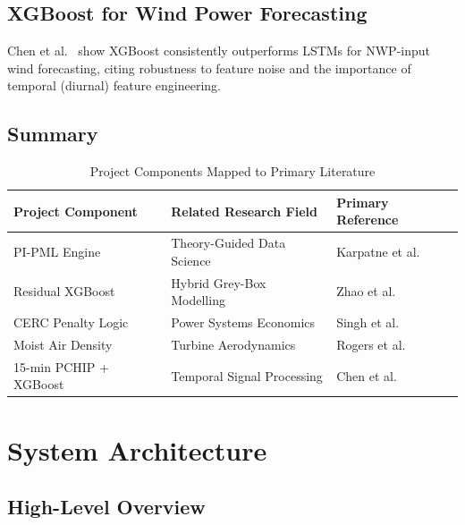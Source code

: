 \documentclass[12pt,a4paper]{report}
\begin{document}
\section{XGBoost for Wind Power Forecasting}

Chen et al.~\cite{chen2018xgboost} show XGBoost consistently outperforms LSTMs for NWP-input
wind forecasting, citing robustness to feature noise and the importance of temporal
(diurnal) feature engineering.

\section{Summary}

\begin{table}[H]
  \centering
  \caption{Project Components Mapped to Primary Literature}
  \label{tab:lit_summary}
  \begin{tabularx}{\textwidth}{lXl}
    \toprule
    \textbf{Project Component} & \textbf{Related Research Field} & \textbf{Primary Reference} \\
    \midrule
    PI-PML Engine           & Theory-Guided Data Science        & Karpatne et al.~\cite{karpatne2017theory} \\
    Residual XGBoost        & Hybrid Grey-Box Modelling         & Zhao et al.~\cite{zhao2016hybrid} \\
    CERC Penalty Logic      & Power Systems Economics           & Singh et al.~\cite{singh2020dsm} \\
    Moist Air Density       & Turbine Aerodynamics              & Rogers et al.~\cite{rogers2014airdensity} \\
    15-min PCHIP + XGBoost  & Temporal Signal Processing        & Chen et al.~\cite{chen2018xgboost} \\
    \bottomrule
  \end{tabularx}
\end{table}

\chapter{System Architecture}
\label{ch:architecture}

\section{High-Level Overview}
\end{document}
